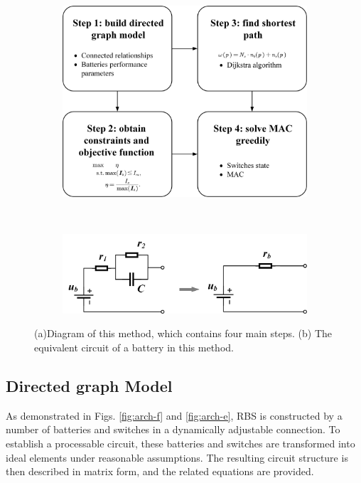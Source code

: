 \documentclass{article}
\begin{document}
\begin{figure}[htbp]
    \centering
    \begin{subfigure}[b]{\textwidth}
        \includegraphics[width=\textwidth]{../attachments/main.png}
        \caption{}
        \label{fig:main}
    \end{subfigure}
    \\ 
    \begin{subfigure}[b]{\textwidth}
        \includegraphics[width=\textwidth]{../attachments/battery_simple.png}
        \caption{}
        \label{fig:battery_simple}
    \end{subfigure}
    \caption{ 
        (a)Diagram of this method, which contains four main steps.
        (b) The equivalent circuit of a battery in this method.
    }
\end{figure}

\subsection{Directed graph Model}

As demonstrated in Figs. \ref{fig:arch-f} and \ref{fig:arch-e}, RBS is constructed by a number of batteries and switches in a dynamically adjustable connection.
To establish a processable circuit, these batteries and switches are transformed into ideal elements under reasonable assumptions.
The resulting circuit structure is then described in matrix form, and the related equations are provided.
\end{document}
